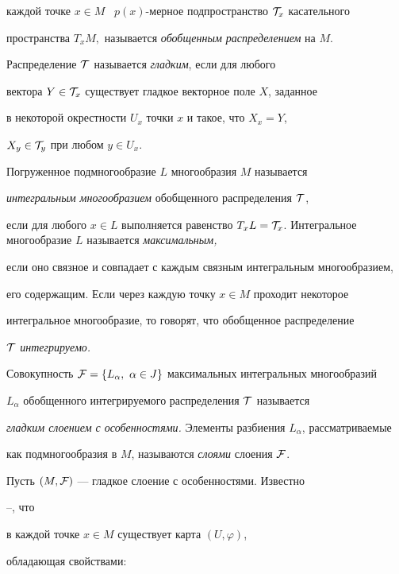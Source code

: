 каждой точке $x\in M$ \ $p(x)$-мерное подпространство ${\cal T}_x$ касательного


пространства $T_xM,$ называется {\it обобщенным распределением} на $M$.


Распределение $\cal T$ называется {\it гладким}, если для любого


вектора $Y\in {\cal T}_x$ существует гладкое векторное поле $X$, заданное


в некоторой окрестности $U_x$ точки $x$ и такое, что $X_x=Y$, 


$X_y\in {\cal T}_y$ при любом $y\in U_x$.





Погруженное подмногообразие $L$ многообразия $M$ называется


{\it интегральным многообразием} обобщенного распределения $\cal T$,


если для любого $x\in L$ выполняется равенство $T_xL={\cal


T}_x$. Интегральное многообразие $L$ называется {\it максимальным,}


если оно связное и совпадает с каждым связным интегральным многообразием,


его содержащим. Если через каждую точку $x\in M$ проходит некоторое


интегральное многообразие, то говорят, что обобщенное распределение


$\cal T$ {\it интегрируемо.}





Совокупность ${\cal F}=\{L_{\alpha},\ \alpha\in J\}$ максимальных интегральных многообразий


$L_{\alpha}$ обобщенного интегрируемого распределения $\cal T$ называется


{\it гладким слоением с особенностями.} Элементы разбиения $L_{\alpha}$, рассматриваемые


как подмногообразия в $M$, называются {\it слоями} слоения $\cal F$.





Пусть $(M,\cal F)$ --- гладкое слоение с особенностями.  Известно


\cite{Sus}--\cite{Daz}, что


в каждой точке $x\in M$ существует карта $(U,\varphi)$,


обладающая свойствами:


